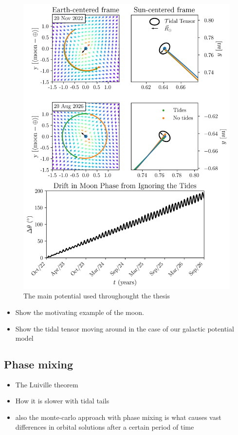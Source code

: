         \begin{figure}
            \centering
            \includegraphics[width=\linewidth]{images/moon_tidal_simulation.png}
            \caption{The main potential used throughought the thesis}
        \end{figure}

        \begin{itemize}
            \item Show the motivating example of the moon. 
            \item Show the tidal tensor moving around in the case of our galactic potential model 
        \end{itemize}


    \subsection{Phase mixing}
        \begin{itemize}
            \item The Luiville theorem
            \item How it is slower with tidal tails 
            \item also the monte-carlo approach with phase mixing is what causes vast differences in orbital solutions after a certain period of time 
        \end{itemize}
    
